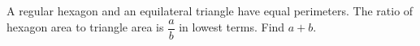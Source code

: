 A regular hexagon and an equilateral triangle have equal perimeters. The ratio of hexagon area to triangle area is $\dfrac{a}{b}$ in lowest terms. Find $a+b$.
